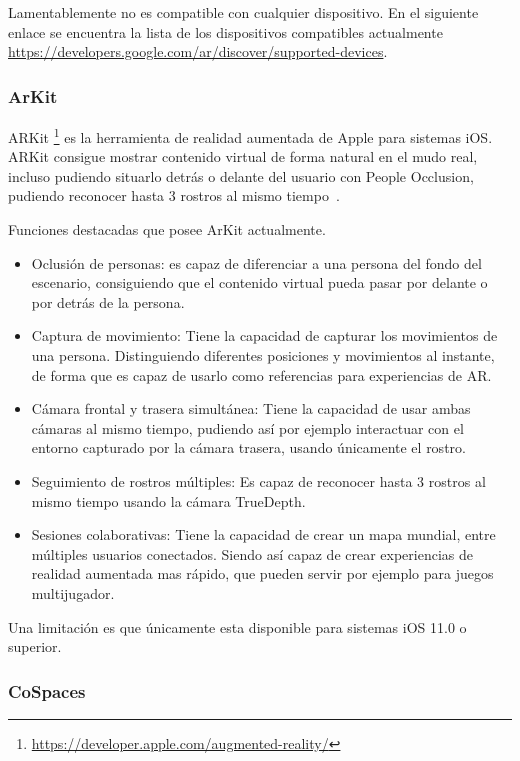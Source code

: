 Lamentablemente no es compatible con cualquier dispositivo. En el siguiente enlace se encuentra la lista de los dispositivos compatibles actualmente \url{https://developers.google.com/ar/discover/supported-devices}.

\subsubsection{ArKit}

ARKit \footnote{\url{https://developer.apple.com/augmented-reality/}} es la herramienta de realidad aumentada de Apple para sistemas iOS. ARKit consigue mostrar contenido virtual de forma natural en el mudo real, incluso pudiendo situarlo detrás o delante del usuario con People Occlusion, pudiendo reconocer hasta 3 rostros al mismo tiempo~\cite{apple_inc}.

Funciones destacadas que posee ArKit actualmente.

\begin{itemize}
	\item Oclusión de personas: es capaz de diferenciar a una persona del fondo del escenario, consiguiendo que el contenido virtual  pueda pasar por delante o por detrás de la persona.
	\item Captura de movimiento: Tiene la capacidad de capturar los movimientos de una persona. Distinguiendo diferentes posiciones y movimientos al instante, de forma que es capaz de usarlo como referencias para experiencias de AR.
	\item Cámara frontal y trasera simultánea: Tiene la capacidad de usar ambas cámaras al mismo tiempo, pudiendo así por ejemplo interactuar con el entorno capturado por la cámara trasera, usando únicamente el rostro.
	\item Seguimiento de rostros múltiples: Es capaz de reconocer hasta 3 rostros al mismo tiempo usando la cámara TrueDepth.
	\item Sesiones colaborativas: Tiene la capacidad de crear un mapa mundial, entre múltiples usuarios conectados. Siendo así capaz de crear experiencias de realidad aumentada mas rápido, que pueden servir por ejemplo para juegos multijugador.
\end{itemize}



Una limitación es que únicamente esta disponible para sistemas iOS 11.0 o superior.


\subsubsection{CoSpaces}\label{sub:Def_cospace} 

